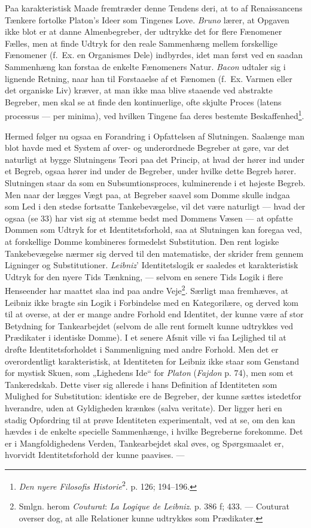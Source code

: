 \documentclass[12pt,a4paper]{book}
\newcommand{\apage}[1]{\marginnote{\footnotesize\textit{[#1]}}}
\begin{document}
Paa karakteristisk Maade fremtræder denne Tendens deri, at to af
Renaissancens Tænkere fortolke Platon's Ideer som Tingenes Love.
\emph{Bruno} lærer, at Opgaven ikke blot er at danne Almenbegreber, der
udtrykke det for flere Fænomener Fælles, men at finde Udtryk for den
reale Sammenhæng mellem forskellige Fænomener (f.\ Ex. en Organismes
Dele) indbyrdes, idet man først ved en saadan Sammenhæng kan forstaa de
enkelte Fænomeners Natur. \emph{Bacon} udtaler sig i lignende Retning,
naar han til Forstaaelse af et Fænomen (f.\ Ex. Varmen eller det
organiske Liv) kræver, at man ikke maa blive staaende ved abstrakte
Begreber, men skal se at finde den kontinuerlige, ofte skjulte Proces
(latens processus --- per minima), ved hvilken Tingene faa deres
bestemte Beskaffenhed\footnote{\emph{Den nyere Filosofis
Historie}\textsuperscript{2}. p. 126; 194--196.}.

Hermed følger nu ogsaa en Forandring i Opfattelsen af Slutningen.
Saalænge man blot havde med et System af over- og underordnede Begreber
at gøre, var det naturligt at bygge Slutningens Teori paa det Princip, at
hvad der hører ind under et Begreb, ogsaa hører ind under de Begreber,
under hvilke dette Begreb hører. Slutningen staar da som en
Subsumtionsproces, kulminerende i et højeste Begreb. Men naar der lægges
Vægt paa, at Begreber saavel som Domme skulle indgaa som Led i den stedse
fortsatte Tankebevægelse, vil det være naturligt --- hvad der ogsaa (se
33) har vist sig at stemme bedst med Dommens Væsen --- at opfatte Dommen
som Udtryk for et Identitetsforhold, saa at Slutningen kan foregaa ved,
at forskellige Domme kombineres formedelst Substitution. Den rent logiske
Tankebevægelse nærmer sig derved til den matematiske, der skrider frem
gennem Ligninger og Substitutioner. \emph{Leibniz}' Identitetslogik er
saaledes et karakteristisk Udtryk for den nyere Tids Tænkning, --- selvom
en senere Tids Logik i flere Henseender har maattet slaa ind paa andre
Veje\footnote{Smlgn. herom \emph{Couturat}: \emph{La Logique de Leibniz}.
p. 386 f; 433. --- Couturat overser dog, at alle Relationer kunne
udtrykkes som Prædikater.}. Særligt \apage{131} maa fremhæves, at Leibniz ikke
bragte sin Logik i Forbindelse med en Kategorilære, og derved kom til at
overse, at der er mange andre Forhold end Identitet, der kunne være af
stor Betydning for Tankearbejdet (selvom de alle rent formelt kunne
udtrykkes ved Prædikater i identiske Domme). I et senere Afsnit ville vi
faa Lejlighed til at drøfte Identitetsforholdet i Sammenligning med andre
Forhold. Men det er overordentligt karakteristisk, at Identiteten for
Leibniz ikke staar som Genstand for mystisk Skuen, som „Lighedens Ide“
for \emph{Platon} (\emph{Fajdon} p. 74), men som et Tankeredskab. Dette
viser sig allerede i hans Definition af Identiteten som Mulighed for
Substitution: identiske ere de Begreber, der kunne sættes istedetfor
hverandre, uden at Gyldigheden krænkes (salva veritate). Der ligger heri
en stadig Opfordring til at prøve Identiteten experimentalt, ved at se, om den kan hævdes i de enkelte specielle Sammenhænge, i hvilke
Begreberne forekomme. Det er i Mangfoldighedens Verden, Tankearbejdet
skal øves, og Spørgsmaalet er, hvorvidt Identitetsforhold der kunne
paavises. ---
\end{document}
